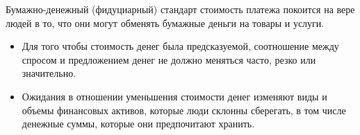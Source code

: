\documentclass[_DKB_p1_Money.tex]{subfiles}
\begin{document}
\begin{frame}
\begin{block}{Бумажно-денежный (фидуциарный) стандарт}
\quad
стоимость платежа покоится на вере людей в то, что они могут обменять бумажные деньги на товары и услуги.
\end{block}
\begin{itemize}
\item
Для того чтобы стоимость денег была предсказуемой, соотношение между спросом и предложением денег не должно меняться часто, резко или значительно.
\item
Ожидания в отношении уменьшения стоимости денег изменяют виды и объемы финансовых активов, которые люди склонны сберегать, в том числе денежные суммы, которые они предпочитают хранить.

\end{itemize}
\end{frame}

\end{document}

